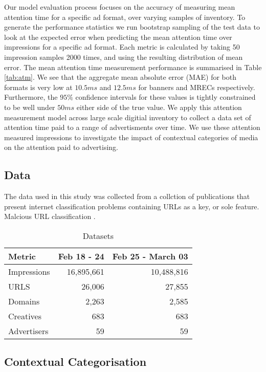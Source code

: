 \documentclass[sigconf]{acmart}
\begin{document}
Our model evaluation process focuses on the accuracy of measuring mean
attention time for a specific ad format, over varying samples of inventory.
To generate the performance statistics we run bootstrap sampling of the test data
to look at the expected error when predicting the mean attention time over
impressions for a specific ad format. Each metric is calculated by taking 50 impression
samples 2000 times, and using the resulting distribution of mean error.
The mean attention time measurement performance is summarised in Table
\ref{tab:atm}.
We see that the aggregate mean absolute error (MAE) for both formats is very low
at $10.5 ms$ and $12.5 ms$ for banners and MRECs respectively. Furthermore, the
$95\%$ confidence intervals for these values is tightly constrained to be well under
$50 ms$ either side of the true value.
We apply this attention measurement model across large scale digitial inventory to
collect a data set of attention time paid to a range of advertisments over time.
We use these attention measured impressions to investigate the
impact of contextual categories of media on the attention paid to advertising.

\subsection{Data}

The data used in this study was collected from a collction of publications that 
present internet classification problems containing URLs as a key, or sole feature.
Malcious URL classification \cite{Mamun2016}.

\begin{table}
\caption{Datasets}
\label{tab:dataset}
\begin{tabular}{|l|r|r|}
\toprule
Metric          &Feb 18 - 24    &Feb 25 - March 03          \\
\midrule
Impressions     &16,895,661     &10,488,816     \\
URLS            &26,006         &27,855         \\
Domains         &2,263          &2,585          \\
Creatives       &683            &683            \\
Advertisers     &59             &59             \\
\bottomrule
\end{tabular}
\end{table}

\subsection{Contextual Categorisation}
\end{document}

